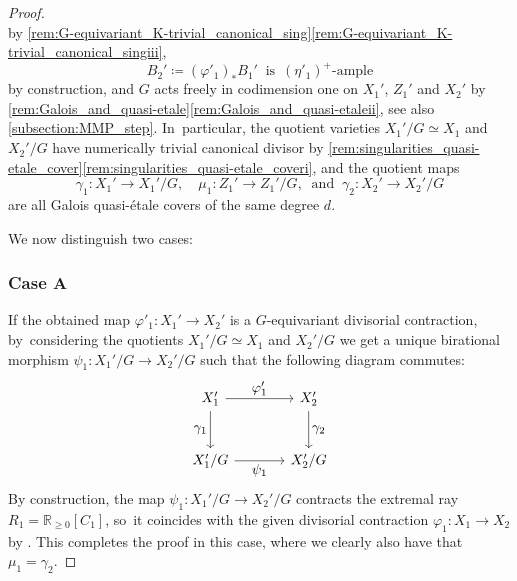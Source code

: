 \documentclass[JEP,XML,SOM,Unicode,published]{cedram}
\let\ts\textstyle
\theoremstyle{plain}
\theoremstyle{definition}
\newcommand{\R}{\mathbb{R}}
\begin{document}
\begin{proof}
\[\]
by \autoref{rem:G-equivariant_K-trivial_canonical_sing}\eqref{rem:G-equivariant_K-trivial_canonical_singiii},
\begin{equation}
\label{eq:2_lifting_MMP}
B_2'\coloneq (\varphi'_1)_* B_1' \ \text{ is } \,(\eta'_1)^+ \text{-ample}
\end{equation}
by construction, and $G$ acts freely in codimension one on $X_1'$, $Z_1'$ and $X_2'$ by \autoref{rem:Galois_and_quasi-etale}\eqref{rem:Galois_and_quasi-etaleii}, see also \autoref{subsection:MMP_step}. In~particular, the quotient varieties $X_1' / G \simeq X_1$ and $X_2' / G$ have numerically trivial canonical divisor by \autoref{rem:singularities_quasi-etale_cover}\eqref{rem:singularities_quasi-etale_coveri}, and the quotient maps
\[
\gamma_1 \colon X_1' \to X_1' / G, \quad \mu_1 \colon Z_1' \to Z_1' / G, \ \text{ and } \ \gamma_2 \colon X_2' \to X_2' / G
\]
are all Galois quasi-étale covers of the same degree $d$.

We now distinguish two cases:

\subsubsection*{Case A}
If the obtained map $\varphi'_1 \colon X_1' \to X_2'$ is a $G$\nobreakdash-equivariant divisorial contraction, by~considering the quotients $X_1' / G \simeq X_1$ and $X_2' / G$ we get a unique birational morphism $\psi_1 \colon X_1' / G \to X_2' / G$ such that the following diagram commutes:
\[
\begin{tikzcd}[row sep = large, column sep = large]
X_1' \arrow[d, "\ts \gamma_1" swap] \arrow[r, "\ts \varphi'_1"] & X_2' \arrow[d, "\ts \gamma_2"] \\
X_1' / G \arrow[r, "\ts \psi_1" swap] & X_2'/G
\end{tikzcd}
\]
By construction, the map $\psi_1 \colon X_1' / G \to X_2' / G$ contracts the extremal ray $R_1 = \R_{\geq 0}[C_1]$, so~it coincides with the given divisorial contraction $\varphi_1 \colon X_1 \to X_2$ by \cite[Prop.\,1.14(b)]{Debarre01book}.
This completes the proof in this case, where we clearly also have that $\mu_1 = \gamma_2$.


\end{proof}
\end{document}
